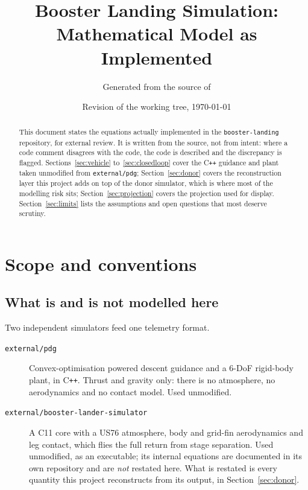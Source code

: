 \documentclass[11pt,a4paper]{article}
\title{Booster Landing Simulation:\\Mathematical Model as Implemented}
\author{Generated from the source of \code{booster-landing}}
\date{Revision of the working tree, \today}
\newcommand{\code}[1]{\texttt{#1}}
\begin{document}
\maketitle

\begin{abstract}
This document states the equations actually implemented in the
\code{booster-landing} repository, for external review. It is written from the
source, not from intent: where a code comment disagrees with the code, the code
is described and the discrepancy is flagged. Sections~\ref{sec:vehicle}
to~\ref{sec:closedloop} cover the C\texttt{++} guidance and plant taken
unmodified from \code{external/pdg}; Section~\ref{sec:donor} covers the
reconstruction layer this project adds on top of the donor simulator, which is
where most of the modelling risk sits; Section~\ref{sec:projection} covers the
projection used for display. Section~\ref{sec:limits} lists the assumptions and
open questions that most deserve scrutiny.
\end{abstract}

\tableofcontents

\section{Scope and conventions}

\subsection{What is and is not modelled here}

Two independent simulators feed one telemetry format.

\begin{description}
\item[\code{external/pdg}] Convex-optimisation powered descent guidance and a
  6-DoF rigid-body plant, in C\texttt{++}. Thrust and gravity only: there is no
  atmosphere, no aerodynamics and no contact model. Used unmodified.
\item[\code{external/booster-lander-simulator}] A C11 core with a US76
  atmosphere, body and grid-fin aerodynamics and leg contact, which flies the
  full return from stage separation. Used unmodified, as an executable; its
  internal equations are documented in its own repository and are \emph{not}
  restated here. What is restated is every quantity this project reconstructs
  from its output, in Section~\ref{sec:donor}.
\end{description}
\end{document}
